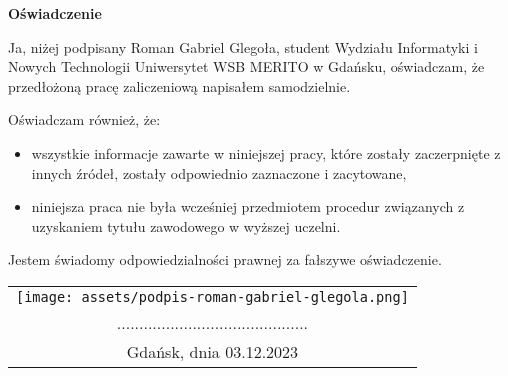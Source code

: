 \thispagestyle{empty}
\begin{center}
    \Large{\textbf{Oświadczenie}}
\end{center}

\vspace{2cm}

Ja, niżej podpisany Roman Gabriel Glegoła, student Wydziału Informatyki i Nowych Technologii Uniwersytet WSB MERITO w Gdańsku, oświadczam, że przedłożoną pracę zaliczeniową napisałem samodzielnie.

Oświadczam również, że:
\begin{itemize}
    \item wszystkie informacje zawarte w niniejszej pracy, które zostały zaczerpnięte z innych źródeł, zostały odpowiednio zaznaczone i zacytowane,
    \item niniejsza praca nie była wcześniej przedmiotem procedur związanych z uzyskaniem tytułu zawodowego w wyższej uczelni.
\end{itemize}

Jestem świadomy odpowiedzialności prawnej za fałszywe oświadczenie.

\vspace{2cm}

\begin{flushright}
    \begin{tabular}{c}
    \texttt{[image: assets/podpis-roman-gabriel-glegola.png]}\\
    ...........................................\\
    Gdańsk, dnia 03.12.2023 \\
    \end{tabular}
\end{flushright}

\vfill